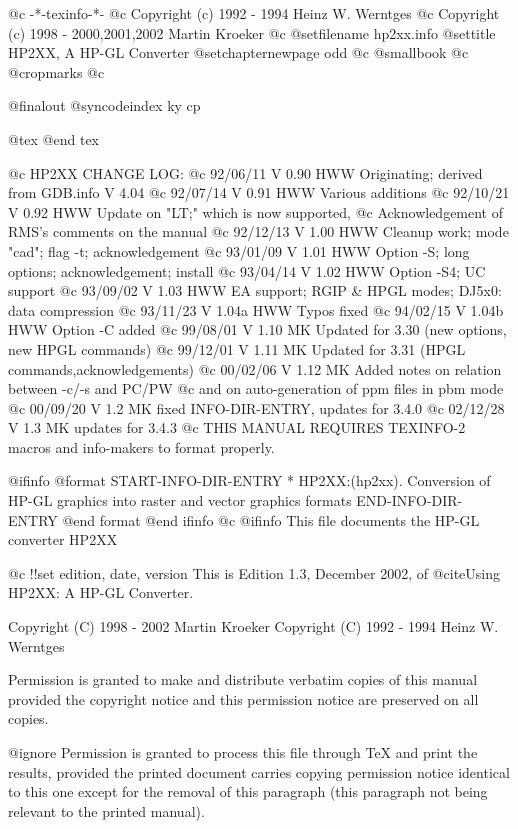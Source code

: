       @c -*-texinfo-*-
@c Copyright (c) 1992 - 1994  Heinz W. Werntges
@c Copyright (c) 1998 - 2000,2001,2002  Martin Kroeker
@c %
@setfilename hp2xx.info
@settitle HP2XX, A HP-GL Converter
@setchapternewpage odd
@c @smallbook
@c @cropmarks
@c %

@finalout
@syncodeindex ky cp

@tex
\xdef\manvers{$Revision: 1.3 $}  %
@end tex

@c HP2XX CHANGE LOG:
@c 92/06/11  V 0.90  HWW  Originating; derived from GDB.info V 4.04
@c 92/07/14  V 0.91  HWW  Various additions
@c 92/10/21  V 0.92  HWW  Update on "LT;" which is now supported,
@c                        Acknowledgement of RMS's comments on the manual
@c 92/12/13  V 1.00  HWW  Cleanup work; mode "cad"; flag -t; acknowledgement
@c 93/01/09  V 1.01  HWW  Option -S; long options; acknowledgement; install
@c 93/04/14  V 1.02  HWW  Option -S4; UC support
@c 93/09/02  V 1.03  HWW  EA support; RGIP & HPGL modes; DJ5x0: data compression
@c 93/11/23  V 1.04a HWW  Typos fixed
@c 94/02/15  V 1.04b HWW  Option -C added
@c 99/08/01  V 1.10  MK   Updated for 3.30 (new options, new HPGL commands)
@c 99/12/01  V 1.11  MK   Updated for 3.31 (HPGL commands,acknowledgements)
@c 00/02/06  V 1.12  MK   Added notes on relation between -c/-s and PC/PW
@c                        and on auto-generation of ppm files in pbm mode
@c 00/09/20  V 1.2   MK   fixed INFO-DIR-ENTRY, updates for 3.4.0
@c 02/12/28  V 1.3   MK   updates for 3.4.3
@c THIS MANUAL REQUIRES TEXINFO-2 macros and info-makers to format properly.

@ifinfo
@format
START-INFO-DIR-ENTRY
* HP2XX:(hp2xx).  Conversion of HP-GL graphics into raster and
                  vector graphics formats
END-INFO-DIR-ENTRY
@end format
@end ifinfo
@c
@ifinfo
This file documents the HP-GL converter HP2XX

@c !!set edition, date, version
This is Edition 1.3, December 2002,
of @cite{Using HP2XX: A HP-GL Converter}.

Copyright (C) 1998 - 2002 Martin Kroeker
Copyright (C) 1992 - 1994 Heinz W. Werntges

Permission is granted to make and distribute verbatim copies of
this manual provided the copyright notice and this permission notice
are preserved on all copies.

@ignore
Permission is granted to process this file through TeX and print the
results, provided the printed document carries copying permission
notice identical to this one except for the removal of this paragraph
(this paragraph not being relevant to the printed manual).

